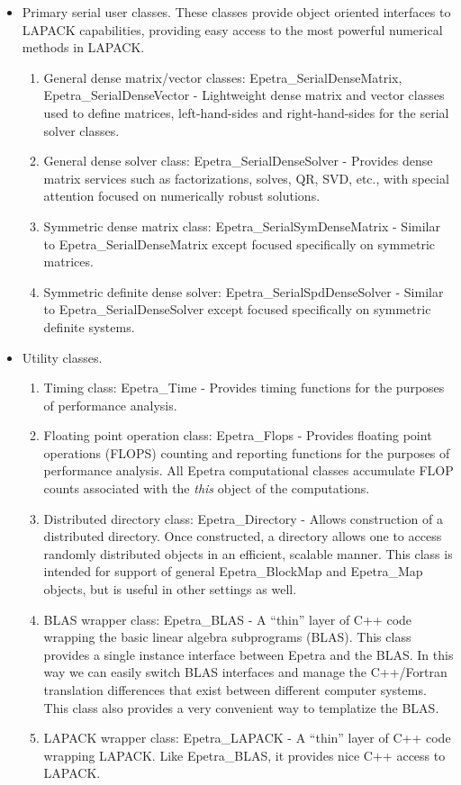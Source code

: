 \begin{itemize}
\item Primary serial user classes.  These classes provide object
  oriented interfaces to LAPACK capabilities, providing easy access to
  the most powerful numerical methods in LAPACK.
\begin{enumerate}
\item General dense matrix/vector classes: Epetra\_SerialDenseMatrix,
  Epetra\_SerialDenseVector - Lightweight dense matrix and vector classes
  used to define matrices, left-hand-sides and right-hand-sides for the
  serial solver classes.
\item General dense solver class: Epetra\_SerialDenseSolver - Provides
  dense matrix services such as factorizations, solves, QR, SVD, etc.,
  with special attention focused on numerically robust solutions.
\item Symmetric dense matrix class: Epetra\_SerialSymDenseMatrix -
  Similar to Epetra\_SerialDenseMatrix except focused specifically on
  symmetric matrices.
\item Symmetric definite dense solver: Epetra\_SerialSpdDenseSolver -
  Similar to Epetra\_SerialDenseSolver except focused specifically on
  symmetric definite systems.
\end{enumerate}

\item Utility classes. 

\begin{enumerate}
\item Timing class: Epetra\_Time - Provides timing functions for the
  purposes of performance analysis.
  
\item Floating point operation class: Epetra\_Flops - Provides floating
  point operations (FLOPS) counting and reporting functions for the
  purposes of performance analysis.  All Epetra computational classes
  accumulate FLOP counts associated with the {\sl this} object of the
  computations.
\item Distributed directory class: Epetra\_Directory - Allows
  construction of a distributed directory.  Once constructed, a
  directory allows one to access randomly distributed objects in an
  efficient, scalable manner.  This class is intended for support of
  general Epetra\_BlockMap and Epetra\_Map objects, but is useful in other
  settings as well.
\item BLAS wrapper class: Epetra\_BLAS - A ``thin'' layer of C++ code
  wrapping the basic linear algebra subprograms (BLAS).  This class
  provides a single instance interface between Epetra and the BLAS.  In
  this way we can easily switch BLAS interfaces and manage the
  C++/Fortran translation differences that exist between different
  computer systems.  This class also provides a very convenient way to
  templatize the BLAS.
\item LAPACK wrapper class: Epetra\_LAPACK - A ``thin'' layer of C++ code
  wrapping LAPACK.  Like Epetra\_BLAS, it provides nice C++ access to
  LAPACK.
\end{enumerate}

\end{itemize}
